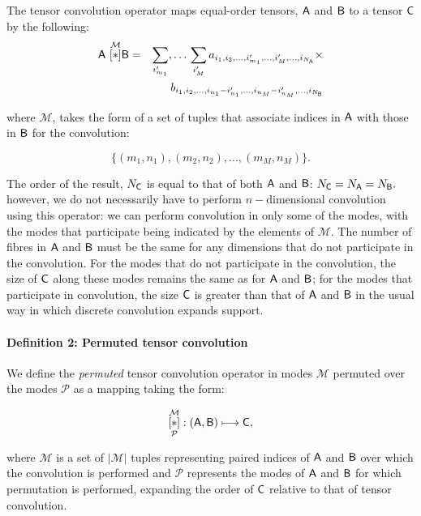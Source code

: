 The tensor convolution operator maps equal-order tensors, $\mathsf{A}$ and $\mathsf{B}$ to a tensor $\mathsf{C}$ by the following:
\begin{eqnarray}
\mathsf{A} \,\, \overset{\mathcal{M}}{[ \ast ]}{\mathsf{B}} &=& \sum_{i'_{m_1}},\ldots\,\sum_{i_{M}'}   a_{i_1,i_2,...,i_{m_1}',...,i_{M}',...,i_{N_{\mathsf{A}}}} \times \nonumber \\
& &b_{i_1,i_2,...,i_{n_1}-i_{n_1}',...,i_{n_M}-i_{n_M}',...,i_{N_{\mathsf{B}}}}
\label{eq:t1}
\end{eqnarray}

where $\mathcal{M}$, takes the form of a set of tuples that associate indices in $\mathsf{A}$ with those in $\mathsf{B}$ for the convolution:

\begin{equation}
\lbrace(m_1,n_1),(m_2,n_2),...,(m_{M},n_{M})\rbrace.
\end{equation}

The order of the result, $N_{\mathsf{C}}$ is equal to that of both $\mathsf{A}$ and $\mathsf{B}$:
$N_{\mathsf{C}} = N_{\mathsf{A}} = N_{\mathsf{B}}.$
however, we do not necessarily have to perform $n-$dimensional convolution using this operator: we can perform convolution in only some of the modes, with the modes that participate being indicated by the elements of $\mathcal{M}$.  The number of fibres in $\mathsf{A}$ and $\mathsf{B}$ must be the same for any dimensions that do not participate in the convolution. For the modes that do not participate in the convolution, the size of $\mathsf{C}$ along these modes remains the same as for $\mathsf{A}$ and $\mathsf{B}$; for the modes that participate in convolution, the size $\mathsf{C}$ is greater than that of $\mathsf{A}$ and $\mathsf{B}$ in the usual way in which discrete convolution expands support.\\

\paragraph{Definition 2: Permuted tensor convolution} We define the {\it permuted} tensor convolution operator in modes $\mathcal{M}$ permuted over the modes $\mathcal{P}$ as a mapping taking the form:

\begin{equation}
 \underset{\mathcal{P}}{\overset{\mathcal{M}}{[ \ast ]}}: \left (\mathsf{A},\mathsf{B}  \right ) \longmapsto \mathsf{C},
\end{equation}

 where $\mathcal{M}$ is a set of $|\mathcal{M}|$ tuples representing paired indices of $\mathsf{A}$ and $\mathsf{B}$ over which the convolution is performed and $\mathcal{P}$ represents the modes of $\mathsf{A}$ and $\mathsf{B}$ for which permutation is performed, expanding the order of $\mathsf{C}$ relative to that of tensor convolution.\\

